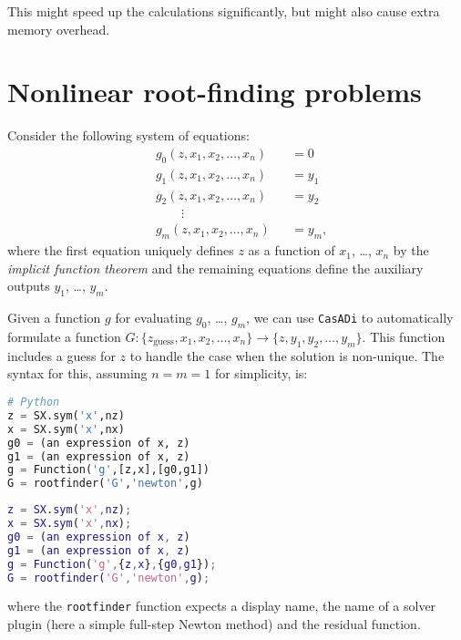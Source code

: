 \documentclass[a4paper,12pt]{book}
\newcommand{\CasADi}{\texttt{CasADi}\xspace}
\begin{document}
This might speed up the calculations significantly, but might also cause extra memory overhead.

\section{Nonlinear root-finding problems} \label{sec:rootfinder}
Consider the following system of equations:
\begin{equation}\label{eq:rfp}
\begin{aligned}
&g_0(z, x_1, x_2, \ldots, x_n) &&= 0 \\
&g_1(z, x_1, x_2, \ldots, x_n) &&= y_1 \\
&g_2(z, x_1, x_2, \ldots, x_n) &&= y_2 \\
&\qquad \vdots \qquad &&\qquad \\
&g_m(z, x_1, x_2, \ldots, x_n) &&= y_m,
\end{aligned}
\end{equation}
where the first equation uniquely defines $z$ as a function of $x_1$, \ldots, $x_n$ by the \emph{implicit function theorem}
and the remaining equations define the auxiliary outputs $y_1$, \ldots, $y_m$.

Given a function $g$ for evaluating $g_0$, \ldots, $g_m$, we can use \CasADi to automatically formulate a function
$G: \{z_{\text{guess}}, x_1, x_2, \ldots, x_n\} \rightarrow \{z, y_1, y_2, \ldots, y_m\}$.
This function includes a guess for $z$ to handle the case when the solution is non-unique.
The syntax for this, assuming $n=m=1$ for simplicity, is:


\begin{minipage}[t]{0.5\textwidth}
\begin{lstlisting}[language=Python]
# Python
z = SX.sym('x',nz)
x = SX.sym('x',nx)
g0 = (an expression of x, z)
g1 = (an expression of x, z)
g = Function('g',[z,x],[g0,g1])
G = rootfinder('G','newton',g)
\end{lstlisting}
\end{minipage}
\begin{minipage}[t]{0.5\textwidth}
\begin{lstlisting}[language=Matlab]
% MATLAB/Octave
z = SX.sym('x',nz);
x = SX.sym('x',nx);
g0 = (an expression of x, z)
g1 = (an expression of x, z)
g = Function('g',{z,x},{g0,g1});
G = rootfinder('G','newton',g);
\end{lstlisting}
\end{minipage}

where the \texttt{rootfinder} function expects a display name, the name of a solver plugin
(here a simple full-step Newton method) and the residual function.
\end{document}
